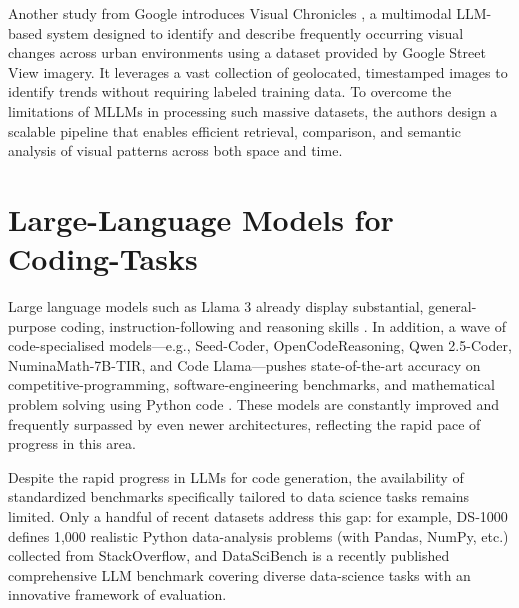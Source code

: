 Another study from Google introduces Visual Chronicles \cite{Deng2025VisualChronicles}, a multimodal LLM-based system designed to identify and describe frequently occurring visual changes across urban environments using a dataset provided by Google Street View imagery. It leverages a vast collection of geolocated, timestamped images to identify trends without requiring labeled training data. To overcome the limitations of MLLMs in processing such massive datasets, the authors design a scalable pipeline that enables efficient retrieval, comparison, and semantic analysis of visual patterns across both space and time.




\section{Large-Language Models for Coding-Tasks}

Large language models such as Llama 3 \cite{Grattafiori2024Llama3} already display substantial, general-purpose coding, instruction-following and reasoning skills \cite{Grattafiori2024Llama3}. In addition, a wave of code-specialised models—e.g., Seed-Coder, OpenCodeReasoning, Qwen 2.5-Coder, NuminaMath-7B-TIR, and Code Llama—pushes state-of-the-art accuracy on competitive-programming, software-engineering benchmarks, and mathematical problem solving using Python code \cite{Seed2025SeedCoder, Ahmad2025OCRNVidia, Hui2024Qwen25Coder, Roziere2024CodeLlama, Moshkov2025AIMO2, Yin2024MuMathCode, Gou2024ToRA}. These models are constantly improved and frequently surpassed by even newer architectures, reflecting the rapid pace of progress in this area.

Despite the rapid progress in LLMs for code generation, the availability of standardized benchmarks specifically tailored to data science tasks remains limited. Only a handful of recent datasets address this gap: for example, DS‑1000 \cite{Lai2022DS1000} defines 1,000 realistic Python data-analysis problems (with Pandas, NumPy, etc.) collected from StackOverflow, and DataSciBench \cite{Zhang2025DataSciBench} is a recently published comprehensive LLM benchmark covering diverse data-science tasks with an innovative framework of evaluation.

